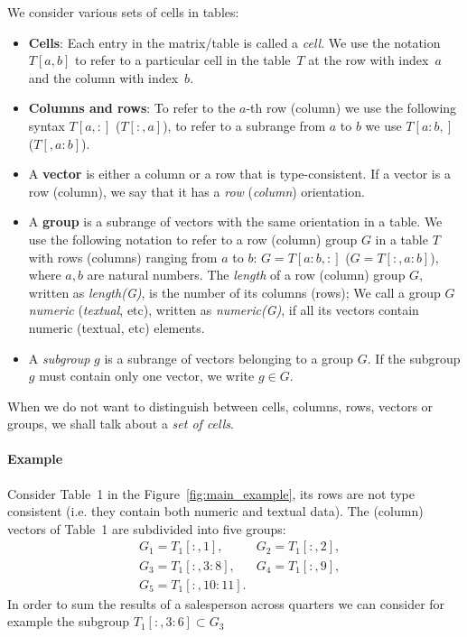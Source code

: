 \documentclass{ecai}
\newcommand{\groups}{\ensuremath{\mathcal{G}}\xspace}
\newcommand{\range}[3]{\ensuremath{#1[#2,#3]}}
\newcommand{\rangeto}[2]{#1{:}#2}
\newcommand{\rangeall}{:}
\begin{document}
We consider various sets of cells in tables:
\begin{itemize}
  \item {\bf Cells}: Each entry in the matrix/table is called  a \textit{cell}.
  We use the notation $T[a,b]$ to refer to a particular cell in the table~$T$ at the row with index~$a$ and the column with index~$b$.
  \item {\bf Columns and rows}: To refer to the $a$-th row (column) we use the following syntax $T[a,{:}]$ ($T[{:},a]$), to refer to a subrange from $a$ to $b$ we use $T[a{:}b,]$ ($T[,a{:}b]$).
  \item
  A \textbf{vector} is either a column or a row that is type-consistent.
  If a vector is a row (column), we say that it has a \textit{row} (\textit{column}) orientation.
  \item
  A \textbf{group} is a subrange of vectors with the same orientation in a table.
  We use the following notation to refer to a row (column) group $G$ in a table $T$ with rows (columns) ranging from $a$ to $b$: $G = T[a{:}b,:]$ ($G = T[{:},a{:}b]$), where $a,b$ are natural numbers.
  The \textit{length} of a row (column) group $G$, written as \textit{length(G)}, is the number of its columns (rows); We call a group $G$ \textit{numeric} (\textit{textual}, etc), written as \textit{numeric(G)}, if all its vectors contain numeric (textual, etc) elements.
  \item
 A \textit{subgroup} $g$ is a subrange of vectors belonging to a group $G$. If the subgroup $g$ must contain only one vector, we write $g \in G$. %
\end{itemize}


When we do not want to distinguish between cells, columns, rows, vectors or groups, we shall talk about a {\em set of cells}.

\paragraph{Example}
Consider Table~1 in the Figure~\ref{fig:main_example}, its rows are not type consistent (i.e. they contain both numeric and textual data).
The (column) vectors of Table~1 are subdivided into five groups:
\begin{align*}
&G_1 = \range{T_1}{\rangeall}{1},
&G_2 = \range{T_1}{\rangeall}{2},\\
&G_3 = \range{T_1}{\rangeall}{\rangeto{3}{8}},
&G_4 = \range{T_1}{\rangeall}{9},\\
&G_5 = \range{T_1}{\rangeall}{\rangeto{10}{11}}.
\end{align*}
In order to sum the results of a salesperson across quarters we can consider for example the subgroup $\range{T_1}{\rangeall}{\rangeto{3}{6}} \subset G_3$
\end{document}
